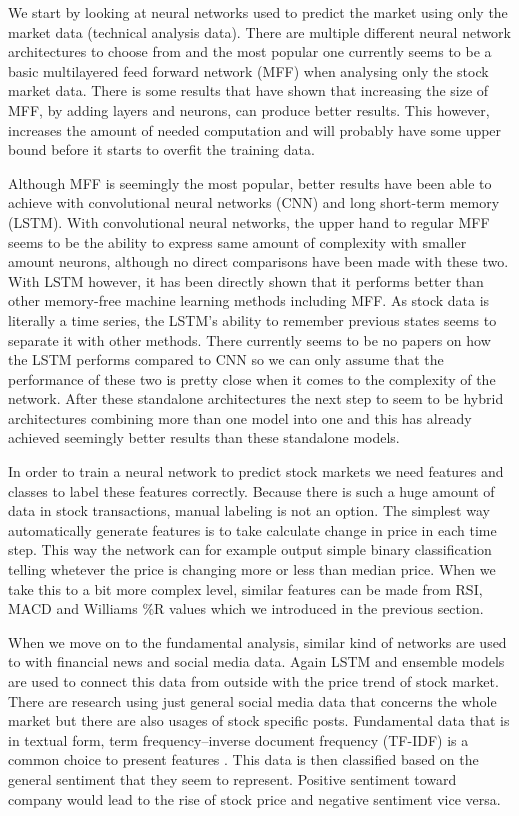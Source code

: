 We start by looking at neural networks used to predict the market using only the market data (technical analysis data).
There are multiple different neural network architectures to choose from and the most popular one currently seems to be a basic multilayered feed forward network (MFF) when analysing only the stock market data.
There is some results that have shown that increasing the size of MFF, by adding layers and neurons, can produce better results.
This however, increases the amount of needed computation and will probably have some upper bound before it starts to overfit the training data. \cite{senguptaa}

Although MFF is seemingly the most popular, better results have been able to achieve with convolutional neural networks (CNN) and long short-term memory (LSTM).
With convolutional neural networks, the upper hand to regular MFF seems to be the ability to express same amount of complexity with smaller amount neurons, although no direct comparisons have been made with these two.
With LSTM however, it has been directly shown that it performs better than other memory-free machine learning methods including MFF.
As stock data is literally a time series, the LSTM's ability to remember previous states seems to separate it with other methods.
There currently seems to be no papers on how the LSTM performs compared to CNN so we can only assume that the performance of these two is pretty close when it comes to the complexity of the network.
After these standalone architectures the next step to seem to be hybrid architectures combining more than one model into one and this has already achieved seemingly better results than these standalone models. \cite{senguptaa}

In order to train a neural network to predict stock markets we need features and classes to label these features correctly.
Because there is such a huge amount of data in stock transactions, manual labeling is not an option.
The simplest way automatically generate features is to take calculate change in price in each time step.
This way the network can for example output simple binary classification telling whetever the price is changing more or less than median price. \cite{fischer}
When we take this to a bit more complex level, similar features can be made from RSI, MACD and Williams \%R values which we introduced in the previous section. \cite{serez}

When we move on to the fundamental analysis, similar kind of networks are used to with financial news and social media data.
Again LSTM and ensemble models are used to connect this data from outside with the price trend of stock market.
There are research using just general social media data that concerns the whole market but there are also usages of stock specific posts.
Fundamental data that is in textual form, term frequency–inverse document frequency (TF-IDF) is a common choice to present features \cite{chungho}.
This data is then classified based on the general sentiment that they seem to represent.
Positive sentiment toward company would lead to the rise of stock price and negative sentiment vice versa.

